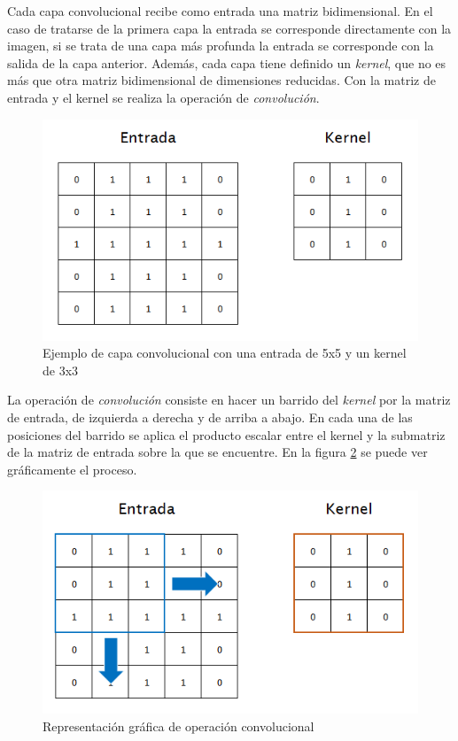 Cada capa convolucional recibe como entrada una matriz bidimensional. En el caso de tratarse de la primera capa la entrada se corresponde directamente con la imagen, si se trata de una capa más profunda la entrada se corresponde con la salida de la capa anterior. Además, cada capa tiene definido un \textit{kernel}, que no es más que otra matriz bidimensional de dimensiones reducidas. Con la matriz de entrada y el kernel se realiza la operación de \textit{convolución}.

\begin{figure}[H]
	\centering
	\includegraphics[width=0.7\linewidth]{images/convolutional_neuron_example.png}
	\caption{Ejemplo de capa convolucional con una entrada de 5x5 y un kernel de 3x3}
	\label{fig:cnn_neuronex}
\end{figure}

La operación de \textit{convolución} consiste en hacer un barrido del \textit{kernel} por la matriz de entrada, de izquierda a derecha y de arriba a abajo. En cada una de las posiciones del barrido se aplica el producto escalar entre el kernel y la submatriz de la matriz de entrada sobre la que se encuentre. En la figura \ref{fig:cnn_convolutionoperationex} se puede ver gráficamente el proceso.

\begin{figure}[H]
	\centering
	\includegraphics[width=0.7\linewidth]{images/convolutional_operation_example.png}
	\caption{Representación gráfica de operación convolucional}
	\label{fig:cnn_convolutionoperationex}
\end{figure}

